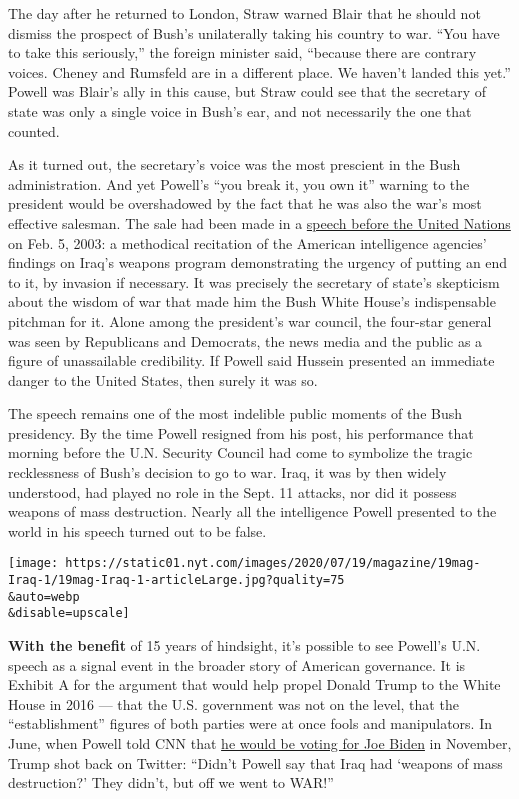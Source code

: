 The day after he returned to London, Straw warned Blair that he should
not dismiss the prospect of Bush's unilaterally taking his country to
war. ``You have to take this seriously,'' the foreign minister said,
``because there are contrary voices. Cheney and Rumsfeld are in a
different place. We haven't landed this yet.'' Powell was Blair's ally
in this cause, but Straw could see that the secretary of state was only
a single voice in Bush's ear, and not necessarily the one that counted.

As it turned out, the secretary's voice was the most prescient in the
Bush administration. And yet Powell's ``you break it, you own it''
warning to the president would be overshadowed by the fact that he was
also the war's most effective salesman. The sale had been made in a
\href{https://www.nytimes.com/2003/02/05/international/middleeast/with-audio-tapes-and-images-powell-makes-case-to-un.html}{speech
before the United Nations} on Feb. 5, 2003: a methodical recitation of
the American intelligence agencies' findings on Iraq's weapons program
demonstrating the urgency of putting an end to it, by invasion if
necessary. It was precisely the secretary of state's skepticism about
the wisdom of war that made him the Bush White House's indispensable
pitchman for it. Alone among the president's war council, the four-star
general was seen by Republicans and Democrats, the news media and the
public as a figure of unassailable credibility. If Powell said Hussein
presented an immediate danger to the United States, then surely it was
so.

The speech remains one of the most indelible public moments of the Bush
presidency. By the time Powell resigned from his post, his performance
that morning before the U.N. Security Council had come to symbolize the
tragic recklessness of Bush's decision to go to war. Iraq, it was by
then widely understood, had played no role in the Sept. 11 attacks, nor
did it possess weapons of mass destruction. Nearly all the intelligence
Powell presented to the world in his speech turned out to be false.

\texttt{[image: https://static01.nyt.com/images/2020/07/19/magazine/19mag-Iraq-1/19mag-Iraq-1-articleLarge.jpg?quality=75\\\&auto=webp\\\&disable=upscale]}

\textbf{With the benefit} of 15 years of hindsight, it's possible to see
Powell's U.N. speech as a signal event in the broader story of American
governance. It is Exhibit A for the argument that would help propel
Donald Trump to the White House in 2016 --- that the U.S. government was
not on the level, that the ``establishment'' figures of both parties
were at once fools and manipulators. In June, when Powell told CNN that
\href{https://www.nytimes.com/2020/06/06/us/politics/trump-biden-republicans-voters.html}{he
would be voting for Joe Biden} in November, Trump shot back on Twitter:
``Didn't Powell say that Iraq had `weapons of mass destruction?' They
didn't, but off we went to WAR!''

